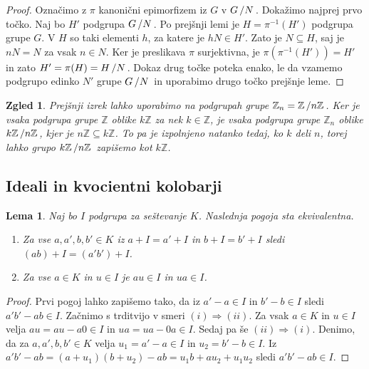\documentclass[10pt, a4paper]{article}
\newtheorem{zgled}{Zgled}[section]
\newtheorem{lema}[izr]{Lema}
\newenvironment{noticeC}{%
  \tcolorbox[%
  notitle,
  empty,
  enhanced,  %
  breakable,
  coltext=black, 
  fontupper=\rmfamily,
  noparskip,
  sharp corners,
  boxrule=-1pt,  %
  frame hidden,
  left=7pt,  %
  right=7pt,
  top=5pt,
  bottom=5pt,
  before skip=2.5ex plus 2pt,
  after skip=2.5ex plus 2pt,
  overlay unbroken and last={%
  },
  ]}
{\endtcolorbox}
\newenvironment{dokaz}%
  {\begin{noticeC}\begin{proof}}%
  {\end{proof}\end{noticeC}}
\newcommand{\Z}{\mathbb {Z}}
\newcommand{\quot}[2]{{\raisebox{0em}{$#1$}\left/\raisebox{0em}{$#2$}\right.}}
\begin{document}
\begin{dokaz}
  Označimo z $\pi$ kanonični epimorfizem iz $G$ v $\quot{G}{N}$.
  Dokažimo najprej prvo točko. Naj bo $H'$ podgrupa $\quot{G}{N}$.
  Po prejšnji lemi je $H = \pi^{-1} (H')$ podgrupa grupe $G$.
  V $H$ so taki elementi $h$, za katere je $hN \in H'$. Zato je $N \subseteq H$,
  saj je $n N = N$ za vsak $n \in N$. Ker je preslikava $\pi$ surjektivna, 
  je $\pi (\pi^{-1} (H')) = H'$ in zato $H' = \pi (H) = \quot{H}{N}$.
  Dokaz drug točke poteka enako, le da vzamemo podgrupo edinko $N'$ grupe $\quot{G}{N}$
  in uporabimo drugo točko prejšnje leme. 
\end{dokaz}

\begin{zgled}
  Prejšnji izrek lahko uporabimo na podgrupah grupe $\Z_n = \quot{\Z}{n\Z}$.
  Ker je vsaka podgrupa grupe $\Z$ oblike $k\Z$ za nek $k \in \Z$, 
  je vsaka podgrupa grupe $\Z_n$ oblike $\quot{k\Z}{n\Z}$, kjer je $n\Z \subseteq k \Z$.
  To pa je izpolnjeno natanko tedaj, ko $k$ deli $n$, torej lahko grupo $\quot{k\Z}{n\Z}$
  zapišemo kot $k\Z$.
\end{zgled}

\subsection{Ideali in kvocientni kolobarji}

\begin{lema}
  Naj bo $I$ podgrupa za seštevanje $K$. Naslednja pogoja sta ekvivalentna.
  \begin{enumerate}
    \item Za vse $a, a', b, b' \in K$ iz $a + I = a' + I$ in $b + I = b' + I$ sledi $(ab) + I = (a' b') + I$.
    \item Za vse $a \in K$ in $u \in I$ je $au \in I$ in $ua \in I$.
  \end{enumerate}
\end{lema}

\begin{dokaz}
  Prvi pogoj lahko zapišemo tako, da iz $a' - a \in I$ in $b' - b \in I$ sledi $a'b' - ab \in I$.
  Začnimo s trditvijo v smeri $(i) \Rightarrow (ii)$. Za vsak $a \in K$ in $u \in I$
  velja $au = au - a0 \in I$ in $ua = ua - 0a \in I$.
  Sedaj pa še $(ii) \Rightarrow (i)$. Denimo, da za $a, a', b, b' \in K$ velja $u_1 = a' - a \in I$
  in $u_2 = b' - b \in I$. Iz $a'b' - ab = (a + u_1) (b + u_2) - ab = u_1 b + a u_2 + u_1 u_2$
  sledi $a'b' - ab \in I$.
\end{dokaz}
\end{document}
